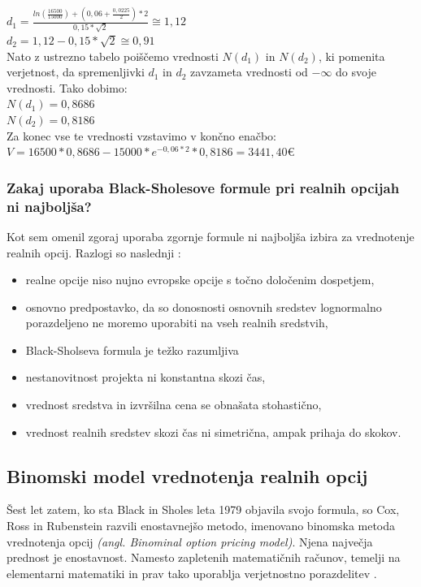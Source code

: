\documentclass[12pt, a4paper]{amsart}
\theoremstyle{definition} %
\theoremstyle{plain} %
\begin{document}
$d_1 = \tfrac{ln(\tfrac{16500}{15000}) + (0,06 + \tfrac{0,0225}{2})* 2}{0,15* \sqrt{2}} \cong 1,12$\\[0,5 cm]
$d_2 = 1,12 - 0,15 * \sqrt{2} \cong 0,91$ \\

Nato z ustrezno tabelo poiščemo vrednosti $N(d_1)$ in $N(d_2)$, ki pomenita verjetnost, da spremenljivki $d_1$ in $d_2$ zavzameta vrednosti od $-\infty$ do svoje vrednosti. Tako dobimo:\\
$N(d_1) = 0,8686$\\
$N(d_2) = 0,8186$\\

Za konec vse te vrednosti vzstavimo v končno enačbo:\\
$V = 16500 * 0,8686 - 15000 * e^{-0,06*2} * 0,8186 = 3441,40$€\\

\subsubsection{Zakaj uporaba Black-Sholesove formule pri realnih opcijah ni najboljša?}
Kot sem omenil zgoraj uporaba zgornje formule ni najboljša izbira za vrednotenje realnih opcij. Razlogi so naslednji \cite[str. 48, 49]{Brach}:
\begin{itemize}
\item realne opcije niso nujno evropske opcije s točno določenim dospetjem,
\item osnovno predpostavko, da so donosnosti osnovnih sredstev lognormalno porazdeljeno ne moremo uporabiti na vseh realnih sredstvih,
\item Black-Sholseva formula je težko razumljiva
\item nestanovitnost projekta ni konstantna skozi čas,
\item vrednost sredstva in izvršilna cena se obnašata stohastično,
\item vrednost realnih sredstev skozi čas ni simetrična, ampak prihaja do skokov.
\end{itemize}

\subsection{Binomski model vrednotenja realnih opcij}
Šest let zatem, ko sta Black in Sholes leta 1979 objavila svojo formula, so Cox, Ross in Rubenstein razvili enostavnejšo metodo, imenovano binomska metoda vrednotenja opcij \textit{(angl. Binominal option pricing model)}. Njena največja prednost je enostavnost. Namesto zapletenih matematičnih računov, temelji na elementarni matematiki in prav tako uporablja verjetnostno porazdelitev \cite[str. 52]{Brach}. \\
\end{document}
